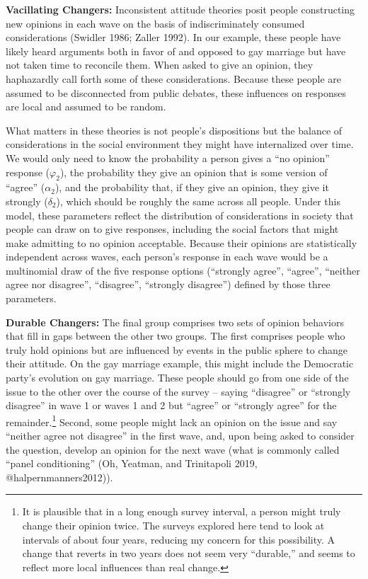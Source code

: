 \documentclass[12pt,]{article}
\begin{document}
\textbf{Vacillating Changers:} Inconsistent attitude theories posit people constructing new opinions in each wave on the basis of indiscriminately consumed considerations (Swidler 1986; Zaller 1992). In our example, these people have likely heard arguments both in favor of and opposed to gay marriage but have not taken time to reconcile them. When asked to give an opinion, they haphazardly call forth some of these considerations. Because these people are assumed to be disconnected from public debates, these influences on responses are local and assumed to be random.

What matters in these theories is not people's dispositions but the balance of considerations in the social environment they might have internalized over time. We would only need to know the probability a person gives a ``no opinion'' response (\(\varphi_2\)), the probability they give an opinion that is some version of ``agree'' (\(\alpha_2\)), and the probability that, if they give an opinion, they give it strongly (\(\delta_2\)), which should be roughly the same across all people. Under this model, these parameters reflect the distribution of considerations in society that people can draw on to give responses, including the social factors that might make admitting to no opinion acceptable. Because their opinions are statistically independent across waves, each person's response in each wave would be a multinomial draw of the five response options (``strongly agree'', ``agree'', ``neither agree nor disagree'', ``disagree'', ``strongly disagree'') defined by those three parameters.

\textbf{Durable Changers:} The final group comprises two sets of opinion behaviors that fill in gaps between the other two groups. The first comprises people who truly hold opinions but are influenced by events in the public sphere to change their attitude. On the gay marriage example, this might include the Democratic party's evolution on gay marriage. These people should go from one side of the issue to the other over the course of the survey -- saying ``disagree'' or ``strongly disagree'' in wave 1 or waves 1 and 2 but ``agree'' or ``strongly agree'' for the remainder.\footnote{It is plausible that in a long enough survey interval, a person might truly change their opinion twice. The surveys explored here tend to look at intervals of about four years, reducing my concern for this possibility. A change that reverts in two years does not seem very ``durable,'' and seems to reflect more local influences than real change.} Second, some people might lack an opinion on the issue and say ``neither agree not disagree'' in the first wave, and, upon being asked to consider the question, develop an opinion for the next wave (what is commonly called ``panel conditioning'' (Oh, Yeatman, and Trinitapoli 2019, @halpernmanners2012)).
\end{document}
